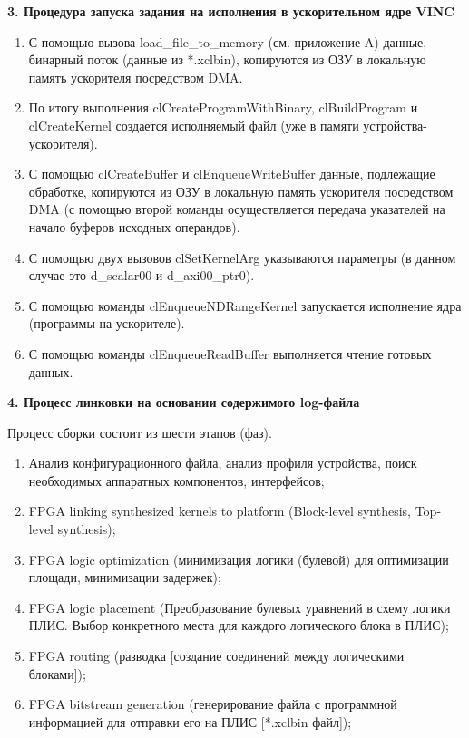 \textbf{3. Процедура запуска задания на исполнения в ускорительном ядре VINC}

\begin{enumerate}
	\item С помощью вызова load\_file\_to\_memory (см. приложение A) данные, бинарный поток (данные из *.xclbin), копируются из ОЗУ в локальную память ускорителя посредством DMA.
	\item По итогу выполнения clCreateProgramWithBinary, clBuildProgram и clCreateKernel  создается исполняемый файл (уже в памяти устройства-ускорителя).
	\item С помощью clCreateBuffer и clEnqueueWriteBuffer данные, подлежащие обработке, копируются из ОЗУ в локальную память ускорителя посредством DMA (с помощью второй команды осуществляется передача указателей на начало буферов исходных операндов).
	\item С помощью двух вызовов clSetKernelArg указываются параметры (в данном случае это d\_scalar00 и d\_axi00\_ptr0).
	\item С помощью команды clEnqueueNDRangeKernel запускается исполнение ядра (программы на ускорителе).
	\item С помощью команды clEnqueueReadBuffer выполняется чтение готовых данных.
\end{enumerate}

\textbf{4. Процесс линковки на основании содержимого log-файла}

Процесс сборки состоит из шести этапов (фаз).
\begin{enumerate}
	\item Анализ конфигурационного файла, анализ профиля устройства, поиск необходимых аппаратных компонентов, интерфейсов;
	\item FPGA linking synthesized kernels to platform (Block-level synthesis, Top-level synthesis);
	\item FPGA logic optimization (минимизация логики (булевой) для оптимизации площади, минимизации задержек);
	\item FPGA logic placement (Преобразование булевых уравнений в схему логики ПЛИС. Выбор конкретного места для каждого логического блока в ПЛИС);
	\item FPGA routing (разводка [создание соединений между логическими блоками]);
	\item FPGA bitstream generation (генерирование файла с программной информацией для отправки его на ПЛИС [*.xclbin файл]);
\end{enumerate}
